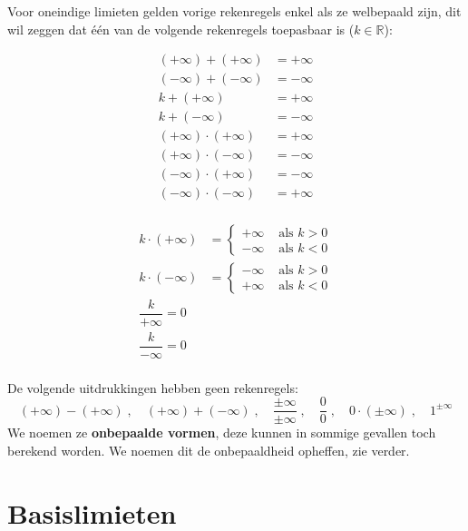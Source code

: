 \documentclass[12pt]{article}
\begin{document}
Voor oneindige limieten gelden vorige rekenregels enkel als ze welbepaald zijn, dit wil zeggen dat één van de volgende rekenregels toepasbaar is ($k\in\mathbb{R}$):

\begin{multicols}{2}
  \begin{align*}
    (+\infty)+(+\infty) &= +\infty\\
    (-\infty)+(-\infty) &= -\infty\\
    k+(+\infty)&=+\infty\\
    k+(-\infty)&=-\infty\\
    (+\infty)\cdot(+\infty) &= +\infty\\
    (+\infty)\cdot(-\infty) &= -\infty\\
    (-\infty)\cdot(+\infty) &= -\infty\\
    (-\infty)\cdot(-\infty) &= +\infty\\
  \end{align*}

  \begin{align*}
    k\cdot(+\infty)&=\begin{cases}+\infty & \mbox{ als } k>0\\-\infty & \mbox{ als } k<0\end{cases}\\
    k\cdot(-\infty)&=\begin{cases}-\infty & \mbox{ als } k>0\\+\infty & \mbox{ als } k<0\end{cases}\\
    \dfrac{k}{+\infty}=0\\
    \dfrac{k}{-\infty}=0\\
  \end{align*}
\end{multicols}

De volgende uitdrukkingen hebben geen rekenregels:
$$(+\infty)-(+\infty)\;,\quad(+\infty)+(-\infty)\;,\quad\dfrac{\pm\infty}{\pm\infty}\;,\quad\dfrac{0}{0}\;,\quad 0\cdot(\pm\infty)\;,\quad 1^{\pm\infty}$$
We noemen ze {\bf onbepaalde vormen}, deze kunnen in sommige gevallen toch berekend worden. We noemen dit de onbepaaldheid opheffen, zie verder.

\pagebreak
\section{Basislimieten}
\end{document}
